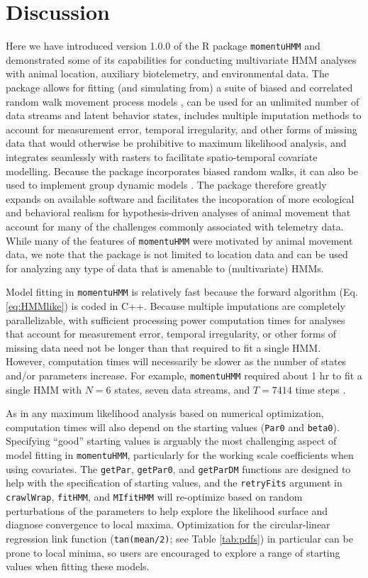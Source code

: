\documentclass[12pt]{article}
\begin{document}
\section{Discussion}
Here we have introduced version 1.0.0 of the R package \verb|momentuHMM| and demonstrated some of its capabilities for conducting multivariate HMM analyses with animal location, auxiliary biotelemetry, and environmental data. The package allows for fitting (and simulating from) a suite of biased and correlated random walk movement process models \citep[e.g.][]{McClintockEtAl2012}, can be used for an unlimited number of data streams and latent behavior states, includes multiple imputation methods to account for measurement error, temporal irregularity, and other forms of missing data that would otherwise be prohibitive to maximum likelihood analysis, and integrates seamlessly with rasters to facilitate spatio-temporal covariate modelling. Because the package incorporates biased random walks, it can also be used to implement group dynamic models \cite[e.g.][]{LangrockEtAl2014}. The package therefore greatly expands on available software and facilitates the incoporation of more ecological and behavioral realism for hypothesis-driven analyses of animal movement that account for many of the challenges commonly associated with telemetry data. While many of the features of \verb|momentuHMM| were motivated by animal movement data, we note that the package is not limited to location data and can be used for analyzing any type of data that is amenable to (multivariate) HMMs.

Model fitting in \verb|momentuHMM| is relatively fast because the forward algorithm (Eq. \ref{eq:HMMlike}) is coded in C++. Because multiple imputations are completely parallelizable, with sufficient processing power computation times for analyses that account for measurement error, temporal irregularity, or other forms of missing data need not be longer than that required to fit a single HMM.  However, computation times will necessarily be slower as the number of states and/or parameters increase. For example, \verb|momentuHMM| required about 1 hr to fit a single HMM with $N=6$ states, seven data streams, and $T=7414$ time steps \citep{McClintock2017}. 

As in any maximum likelihood analysis based on numerical optimization, computation times will also depend on the starting values (\verb|Par0| and \verb|beta0|). Specifying ``good'' starting values is arguably the most challenging aspect of model fitting in \verb|momentuHMM|, particularly for the working scale coefficients when using covariates. The \verb|getPar|, \verb|getPar0|, and \verb|getParDM| functions are designed to help with the specification of starting values, and the \verb|retryFits| argument in \verb|crawlWrap|, \verb|fitHMM|, and \verb|MIfitHMM| will re-optimize based on random perturbations of the parameters to help explore the likelihood surface and diagnose convergence to local maxima. Optimization for the circular-linear regression link function (\verb|tan(mean/2)|; see Table \ref{tab:pdfs}) in particular can be prone to local minima, so users are encouraged to explore a range of starting values when fitting these models.
\end{document}
